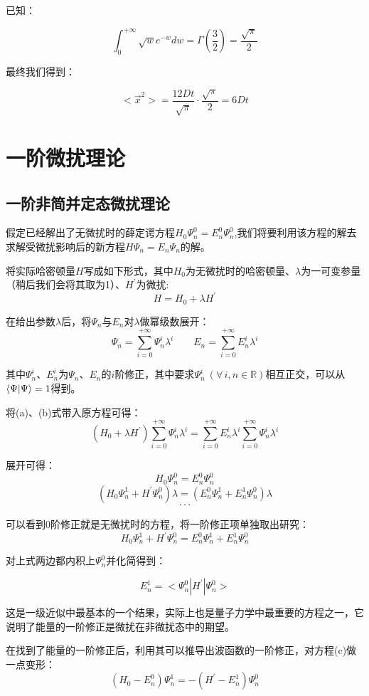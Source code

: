 已知：

\[\int_{0}^{+\infty}\sqrt{w}e^{-w}dw=\Gamma(\frac{3}{2})=\frac{\sqrt{\pi}}{2}\]

最终我们得到：

\[<\vec{x}^2>=\frac{12Dt}{\sqrt{\pi}} \cdot \frac{\sqrt{\pi}}{2}=6Dt \tag{*}\]

\section{一阶微扰理论}
\subsection{一阶非简并定态微扰理论}
假定已经解出了无微扰时的薛定谔方程$H_0 \varPsi_n^0 =E_n^0 \varPsi_n^0$,我们将要利用该方程的解去求解受微扰影响后的新方程$H \varPsi_n =E_n \varPsi_n$的解。

将实际哈密顿量$H$写成如下形式，其中$H_0$为无微扰时的哈密顿量、$\lambda$为一可变参量（稍后我们会将其取为1）、$H^{'}$为微扰:
\[H=H_0+\lambda H^{'} \tag{a}\]

在给出参数$\lambda$后，将$\varPsi_n$与$E_n$对$\lambda$做幂级数展开：
\[\varPsi_n=\sum_{i=0}^{+\infty}\varPsi_n^i\lambda^i \qquad E_n=\sum_{i=0}^{+\infty}E_n^i\lambda^i \tag{b}\]

其中$\varPsi_n^i$、$E_n^i$为$\varPsi_n$、$E_n$的$i$阶修正，其中要求$\varPsi_n^i \ (\forall \, i,n \in \mathbb{R})$相互正交，可以从$\bra{\Psi}\ket{\Psi}=1$得到。

将(a)、(b)式带入原方程可得：
\[(H_0+\lambda H^{'})\sum_{i=0}^{+\infty}\varPsi_n^i\lambda^i=\sum_{i=0}^{+\infty}E_n^i\lambda^i\sum_{i=0}^{+\infty}\varPsi_n^i\lambda^i\]

展开可得：
\[H_0 \varPsi_n^0=E_n^0 \varPsi_n^0\]
\[(H_0 \varPsi_n^1+H^{'} \varPsi_n^0)\lambda=(E_n^0 \varPsi_n^1+E_n^1 \varPsi_n^0)\lambda\]
\[\cdot\cdot\cdot\]

可以看到0阶修正就是无微扰时的方程，将一阶修正项单独取出研究：
\[H_0 \varPsi_n^1+H^{'} \varPsi_n^0=E_n^0 \varPsi_n^1+E_n^1 \varPsi_n^0 \tag{c}\]

对上式两边都内积上$\varPsi_n^0$并化简得到：

\[E_n^1=<\varPsi_n^0|H^{'}|\varPsi_n^0>\]

这是一级近似中最基本的一个结果，实际上也是量子力学中最重要的方程之一，它说明了能量的一阶修正是微扰在非微扰态中的期望。

在找到了能量的一阶修正后，利用其可以推导出波函数的一阶修正，对方程(c)做一点变形：
\[(H_0-E_n^0) \varPsi_n^1=-(H^{'}-E_n^1) \varPsi_n^0 \tag{d}\]

